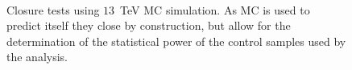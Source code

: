 \begin{figure}[h!]
  \centering
  ~~
  \\
  \caption{\label{fig:closureTests} Closure tests using $13$~TeV MC simulation. As MC is used to predict itself they close by construction, but allow for the determination of the statistical power of the control samples used by the analysis.}
\end{figure}